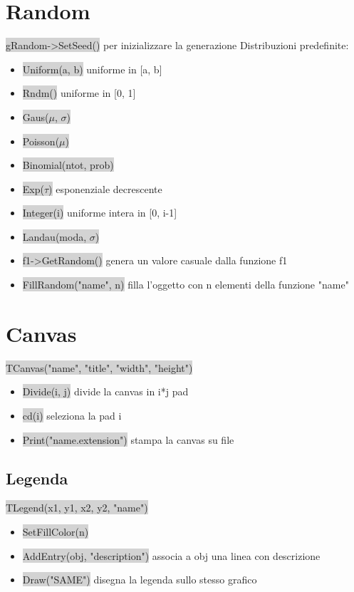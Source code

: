 \documentclass[a4paper]{article}
\begin{document}
\section{Random}
    \colorbox{LightGray}{gRandom->SetSeed()} per inizializzare la generazione
    Distribuzioni predefinite:
    \begin{itemize}
        \item \colorbox{LightGray}{Uniform(a, b)} uniforme in [a, b]
        \item \colorbox{LightGray}{Rndm()} uniforme in [0, 1]
        \item \colorbox{LightGray}{Gaus($\mu$, $\sigma$)}
        \item \colorbox{LightGray}{Poisson($\mu$)}
        \item \colorbox{LightGray}{Binomial(ntot, prob)}
        \item \colorbox{LightGray}{Exp($\tau$)} esponenziale decrescente
        \item \colorbox{LightGray}{Integer(i)} uniforme intera in [0, i-1]
        \item \colorbox{LightGray}{Landau(moda, $\sigma$)}
        \item \colorbox{LightGray}{f1->GetRandom()} genera un valore casuale dalla funzione f1
        \item \colorbox{LightGray}{FillRandom("name", n)} filla l'oggetto con n elementi della funzione "name"
    \end{itemize}
\section{Canvas}
    \colorbox{LightGray}{TCanvas("name", "title", "width", "height")}
    \begin{itemize}
        \item \colorbox{LightGray}{Divide(i, j)} divide la canvas in i*j pad
        \item \colorbox{LightGray}{cd(i)} seleziona la pad i
        \item \colorbox{LightGray}{Print("name.extension")} stampa la canvas su file
    \end{itemize}
    \subsection{Legenda}
    \colorbox{LightGray}{TLegend(x1, y1, x2, y2, "name")}
    \begin{itemize}
        \item \colorbox{LightGray}{SetFillColor(n)}
        \item \colorbox{LightGray}{AddEntry(obj, "description")} associa a obj una linea con descrizione
        \item \colorbox{LightGray}{Draw("SAME")} disegna la legenda sullo stesso grafico
    \end{itemize}
\end{document}
